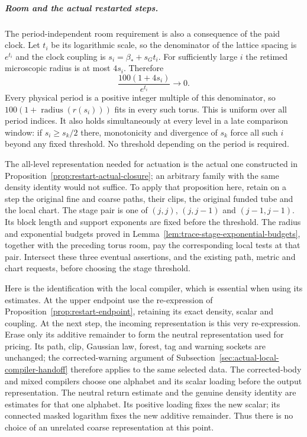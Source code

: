 \subparagraph{Room and the actual restarted steps.}
The period-independent room requirement is also a consequence of the
paid clock. Let $t_i$ be its logarithmic scale, so the denominator of
the lattice spacing is $e^{t_i}$ and the clock coupling is
$s_i=\beta_*+s_Gt_i$. For sufficiently large $i$ the retimed microscopic
radius is at most $4s_i$. Therefore
\[
 \frac{100(1+4s_i)}{e^{t_i}}\longrightarrow0.
\]
Every physical period is a positive integer multiple of this denominator,
so $100(1+\operatorname{radius}(r(s_i)))$ fits in every such torus.
This is uniform over all period indices. It also holds simultaneously
at every level in a late comparison window: if $s_i\ge s_k/2$ there,
monotonicity and divergence of $s_k$ force all such $i$ beyond any fixed
threshold. No threshold depending on the period is required.

The all-level representation needed for actuation is the actual one
constructed in Proposition~\ref{prop:restart-actual-closure}; an arbitrary
family with the same density identity would not suffice. To apply that
proposition here, retain on a step the original fine and coarse paths,
their clips, the original funded tube and the local chart. The stage pair
is one of $(j,j)$, $(j,j-1)$ and $(j-1,j-1)$. Its block length and support
exponents are fixed before the threshold. The radius and exponential
budgets proved in Lemma~\ref{lem:trace-stage-exponential-budgets}, together
with the preceding torus room, pay the corresponding local tests at
that pair. Intersect these three eventual assertions, and the existing
path, metric and chart requests, before choosing the stage threshold.

Here is the identification with the local compiler, which is essential
when using its estimates. At the upper endpoint use the re-expression
of Proposition~\ref{prop:restart-endpoint}, retaining its exact density,
scalar and coupling. At the next step, the incoming representation is
this very re-expression. Erase only its additive remainder to form the
neutral representation used for pricing. Its path, clip, Gaussian law,
forest, tag and warning sockets are unchanged; the corrected-warning
argument of Subsection~\ref{sec:actual-local-compiler-handoff} therefore
applies to the same selected data. The corrected-body and mixed
compilers choose one alphabet and its scalar loading before the output
representation. The neutral return estimate and the genuine density
identity are estimates for that one alphabet. Its positive loading
fixes the new scalar; its connected masked logarithm fixes the new
additive remainder. Thus there is no choice of an unrelated coarse
representation at this point.

